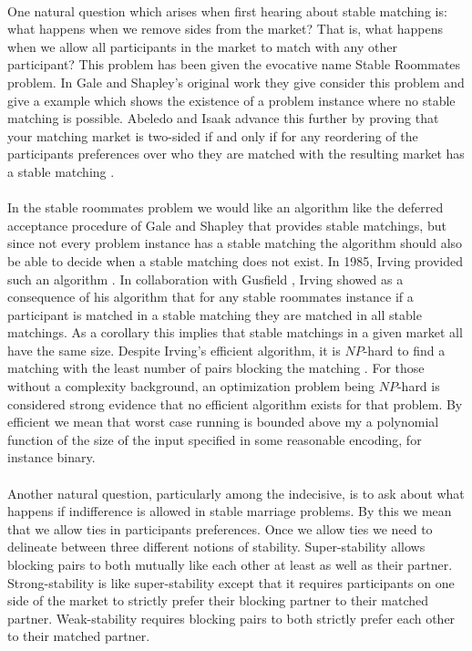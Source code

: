 \paragraph{}
One natural question which arises when first hearing about stable matching is: what happens when we remove sides from the market? That is, what happens when we allow all participants in the market to match with any other participant? This problem has been given the evocative name Stable Roommates problem. In Gale and Shapley's original work \cite{gale1962college} they give consider this problem and give a example which shows the existence of a problem instance where no stable matching is possible.  Abeledo and Isaak advance this further by proving that your matching market is two-sided if and only if for any reordering of the participants preferences over who they are matched with the resulting market has a stable matching \cite{abeledo1991characterization}.
\paragraph{}
In the stable roommates problem we would like an algorithm like the deferred acceptance procedure of Gale and Shapley that provides stable matchings, but since not every problem instance has a stable matching the algorithm should also be able to decide when a stable matching does not exist. In 1985, Irving provided such an algorithm \cite{irving1985efficient}. In collaboration with Gusfield \cite{irving1987efficient}, Irving showed as a consequence of his algorithm that for any stable roommates instance if a participant is matched in a stable matching they are matched in all stable matchings. As a corollary this implies that stable matchings in a given market all have the same size. Despite Irving's efficient algorithm, it is $NP$-hard to find a matching with the least number of pairs blocking the matching \cite{abraham2005almost}. For those without a complexity background, an optimization problem being $NP$-hard is considered strong evidence that no efficient algorithm exists for that problem. By efficient we mean that worst case running is bounded above my a polynomial function of the size of the input specified in some reasonable encoding, for instance binary.
\paragraph{}
Another natural question, particularly among the indecisive, is to ask about what happens if indifference is allowed in stable marriage problems. By this we mean that we allow ties in participants preferences. Once we allow ties we need to delineate between three different notions of stability. Super-stability allows blocking pairs to both mutually like each other at least as well as their partner. Strong-stability is like super-stability except that it requires participants on one side of the market to strictly prefer their blocking partner to their matched partner.  Weak-stability requires blocking pairs to both strictly prefer each other to their matched partner.

